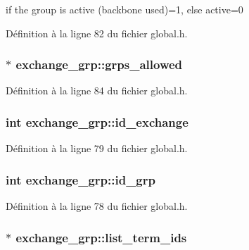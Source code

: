 if the group is active (backbone used)=1, else active=0 



Définition à la ligne 82 du fichier global.\+h.

\hypertarget{structexchange__grp_af300e925b5c53ddf77449dfcf6b69b1f}{
\subsubsection[{grps\+\_\+allowed}]{$\ast$ exchange\+\_\+grp\+::grps\+\_\+allowed}}\label{structexchange__grp_af300e925b5c53ddf77449dfcf6b69b1f}


Définition à la ligne 84 du fichier global.\+h.

\hypertarget{structexchange__grp_ab0bdc5b169d2a90cae8755fe217e9c14}{
\subsubsection[{id\+\_\+exchange}]{\setlength{\rightskip}{0pt plus 5cm}int exchange\+\_\+grp\+::id\+\_\+exchange}}\label{structexchange__grp_ab0bdc5b169d2a90cae8755fe217e9c14}


Définition à la ligne 79 du fichier global.\+h.

\hypertarget{structexchange__grp_a2ae0b34a2185599d4cc1715f786a5609}{
\subsubsection[{id\+\_\+grp}]{\setlength{\rightskip}{0pt plus 5cm}int exchange\+\_\+grp\+::id\+\_\+grp}}\label{structexchange__grp_a2ae0b34a2185599d4cc1715f786a5609}


Définition à la ligne 78 du fichier global.\+h.

\hypertarget{structexchange__grp_a67c91f8058e419de5d63942855a20527}{
\subsubsection[{list\+\_\+term\+\_\+ids}]{$\ast$ exchange\+\_\+grp\+::list\+\_\+term\+\_\+ids}}\label{structexchange__grp_a67c91f8058e419de5d63942855a20527}


